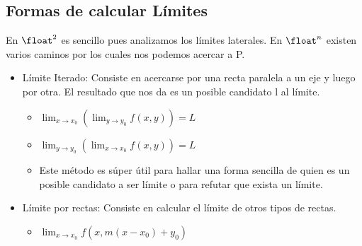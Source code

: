 \documentclass[10pt,a4paper]{article}
\begin{document}
\subsection*{Formas de calcular Límites}
En $\float^{2}$ es sencillo pues analizamos los límites laterales. En $\float^{n}$ existen varios caminos por los cuales nos podemos acercar a P.
\begin{itemize}
    \item Límite Iterado: Consiste en acercarse por una recta paralela a un eje y luego por otra. El resultado que nos da es un posible candidato l al límite.
    \begin{itemize}
        \item $\lim_{x \to x_0} \left( \lim_{y \to y_0} f(x, y) \right) = L$
        \item $\lim_{y \to y_0} \left( \lim_{x \to x_0} f(x, y) \right) = L$
        \item Este método es súper útil para hallar una forma sencilla de quien es un posible candidato a ser límite o para refutar que exista un límite.
    \end{itemize}
    \item Límite por rectas: Consiste en calcular el límite de otros tipos de rectas. 
    \begin{itemize}
        \item $\lim_{x \to x_0} f(x, m(x-x_{0}) + y_{0})$
    \end{itemize}

\end{itemize}
\end{document}
